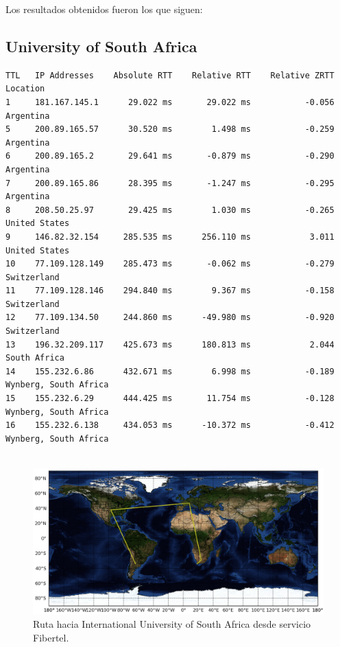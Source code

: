 \documentclass[10pt, a4paper]{article}
\begin{document}
Los resultados obtenidos fueron los que siguen:

\subsection{University of South Africa}

\begin{verbatim}
TTL   IP Addresses    Absolute RTT    Relative RTT    Relative ZRTT  Location
1     181.167.145.1      29.022 ms       29.022 ms           -0.056  Argentina
5     200.89.165.57      30.520 ms        1.498 ms           -0.259  Argentina
6     200.89.165.2       29.641 ms       -0.879 ms           -0.290  Argentina
7     200.89.165.86      28.395 ms       -1.247 ms           -0.295  Argentina
8     208.50.25.97       29.425 ms        1.030 ms           -0.265  United States
9     146.82.32.154     285.535 ms      256.110 ms            3.011  United States
10    77.109.128.149    285.473 ms       -0.062 ms           -0.279  Switzerland
11    77.109.128.146    294.840 ms        9.367 ms           -0.158  Switzerland
12    77.109.134.50     244.860 ms      -49.980 ms           -0.920  Switzerland
13    196.32.209.117    425.673 ms      180.813 ms            2.044  South Africa
14    155.232.6.86      432.671 ms        6.998 ms           -0.189  Wynberg, South Africa
15    155.232.6.29      444.425 ms       11.754 ms           -0.128  Wynberg, South Africa
16    155.232.6.138     434.053 ms      -10.372 ms           -0.412  Wynberg, South Africa


\end{verbatim}


\begin{figure}[H] %
\begin{center}
\includegraphics[width=400pt]{../imgs/map-unisa.png}
\caption{Ruta hacia International University of South Africa desde servicio Fibertel.}
\end{center}
\end{figure}
\end{document}
